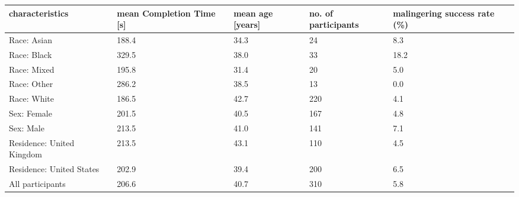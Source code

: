 \begin{tabular}{R{1.7in}|L{1in}|L{.7in}|L{.8in}|L{1.2in}}\hline
characteristics& mean  Completion  Time  [s] & mean  age  [years] & no.  of  participants & malingering success  rate  (\%) \\\hline
 \rowcolor{\ACOL}Race:  Asian &188.4&34.3&24&8.3\\\hline
 \rowcolor{\ACOL}Race:  Black &329.5&38.0&33&18.2\\\hline
 \rowcolor{\ACOL}Race:  Mixed &195.8&31.4&20&5.0\\\hline
 \rowcolor{\ACOL}Race:  Other &286.2&38.5&13&0.0\\\hline
 \rowcolor{\ACOL}Race:  White &186.5&42.7&220&4.1\\\hline
 \rowcolor{\BCOL}Sex:  Female &201.5&40.5&167&4.8\\\hline
 \rowcolor{\BCOL}Sex:  Male &213.5&41.0&141&7.1\\\hline
 \rowcolor{\CCOL}Residence:  United  Kingdom &213.5&43.1&110&4.5\\\hline
 \rowcolor{\CCOL}Residence:  United  States &202.9&39.4&200&6.5\\\hline
  \rowcolor{\DCOL} All participants  &206.6&40.7&310&5.8\\\hline
 \hline\end{tabular}
